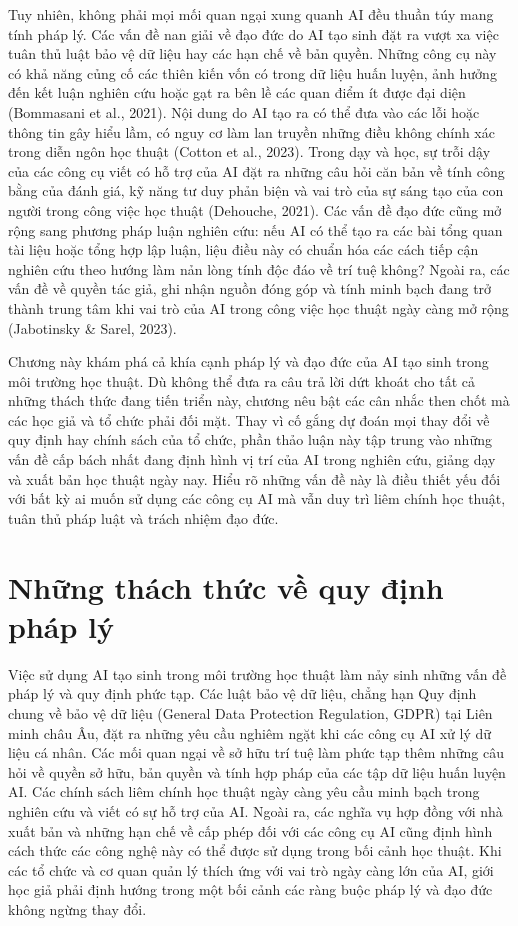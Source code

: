Tuy nhiên, không phải mọi mối quan ngại xung quanh AI đều thuần túy mang tính pháp lý. Các vấn đề nan giải về đạo đức do AI tạo sinh đặt ra vượt xa việc tuân thủ luật bảo vệ dữ liệu hay các hạn chế về bản quyền. Những công cụ này có khả năng củng cố các thiên kiến vốn có trong dữ liệu huấn luyện, ảnh hưởng đến kết luận nghiên cứu hoặc gạt ra bên lề các quan điểm ít được đại diện (Bommasani et al., 2021). Nội dung do AI tạo ra có thể đưa vào các lỗi hoặc thông tin gây hiểu lầm, có nguy cơ làm lan truyền những điều không chính xác trong diễn ngôn học thuật (Cotton et al., 2023). Trong dạy và học, sự trỗi dậy của các công cụ viết có hỗ trợ của AI đặt ra những câu hỏi căn bản về tính công bằng của đánh giá, kỹ năng tư duy phản biện và vai trò của sự sáng tạo của con người trong công việc học thuật (Dehouche, 2021). Các vấn đề đạo đức cũng mở rộng sang phương pháp luận nghiên cứu: nếu AI có thể tạo ra các bài tổng quan tài liệu hoặc tổng hợp lập luận, liệu điều này có chuẩn hóa các cách tiếp cận nghiên cứu theo hướng làm nản lòng tính độc đáo về trí tuệ không? Ngoài ra, các vấn đề về quyền tác giả, ghi nhận nguồn đóng góp và tính minh bạch đang trở thành trung tâm khi vai trò của AI trong công việc học thuật ngày càng mở rộng (Jabotinsky \& Sarel, 2023).

Chương này khám phá cả khía cạnh pháp lý và đạo đức của AI tạo sinh trong môi trường học thuật. Dù không thể đưa ra câu trả lời dứt khoát cho tất cả những thách thức đang tiến triển này, chương nêu bật các cân nhắc then chốt mà các học giả và tổ chức phải đối mặt. Thay vì cố gắng dự đoán mọi thay đổi về quy định hay chính sách của tổ chức, phần thảo luận này tập trung vào những vấn đề cấp bách nhất đang định hình vị trí của AI trong nghiên cứu, giảng dạy và xuất bản học thuật ngày nay. Hiểu rõ những vấn đề này là điều thiết yếu đối với bất kỳ ai muốn sử dụng các công cụ AI mà vẫn duy trì liêm chính học thuật, tuân thủ pháp luật và trách nhiệm đạo đức.

\section{Những thách thức về quy định pháp lý}

Việc sử dụng AI tạo sinh trong môi trường học thuật làm nảy sinh những vấn đề pháp lý và quy định phức tạp. Các luật bảo vệ dữ liệu, chẳng hạn Quy định chung về bảo vệ dữ liệu (General Data Protection Regulation, GDPR) tại Liên minh châu Âu, đặt ra những yêu cầu nghiêm ngặt khi các công cụ AI xử lý dữ liệu cá nhân. Các mối quan ngại về sở hữu trí tuệ làm phức tạp thêm những câu hỏi về quyền sở hữu, bản quyền và tính hợp pháp của các tập dữ liệu huấn luyện AI. Các chính sách liêm chính học thuật ngày càng yêu cầu minh bạch trong nghiên cứu và viết có sự hỗ trợ của AI. Ngoài ra, các nghĩa vụ hợp đồng với nhà xuất bản và những hạn chế về cấp phép đối với các công cụ AI cũng định hình cách thức các công nghệ này có thể được sử dụng trong bối cảnh học thuật. Khi các tổ chức và cơ quan quản lý thích ứng với vai trò ngày càng lớn của AI, giới học giả phải định hướng trong một bối cảnh các ràng buộc pháp lý và đạo đức không ngừng thay đổi.

